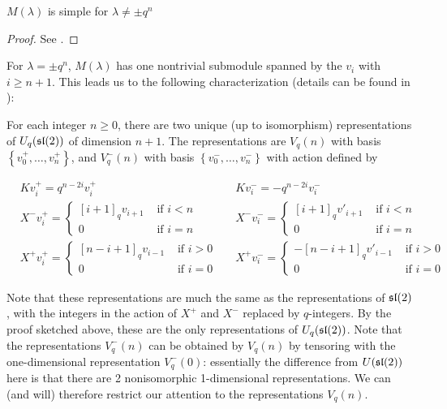 \begin{claim}
    $M(\lambda)$ is simple for $\lambda \neq \pm q^n$
\end{claim}

\begin{proof}
    See \cite{Jantzen1995}.
\end{proof}

For $\lambda = \pm q^{n}$, $M(\lambda)$ has one nontrivial submodule spanned by the $v_i$ with $i \geq n+1$.
This leads us to the following characterization (details can be found in \cite{Jantzen1995}):


For each integer $n \geq 0$, there are two unique (up to isomorphism)
representations of $U_q(\mathfrak{sl}(2))$ of dimension $n+1$. 
The representations are $V_q(n)$ with basis $\left\{ v^+_0, \ldots, v^+_n
\right\}$, and $V_q^-(n)$ with basis $\left\{ v^-_0, \ldots, v^-_n \right\}$
with action defined by 

\begin{align*}
    &K v^+_i = q^{n-2i} v^+_i  &
    &K v^-_i = -q^{n-2i} v^-_i \\
    &X^- v^+_i = \begin{cases} [i+1]_qv_{i+1}& \text{ if $i < n$} \\ 0& \text{ if $i = n$} \end{cases} &
    &X^- v^-_i = \begin{cases} [i+1]_qv'_{i+1}& \text{ if $i < n$} \\ 0& \text{ if $i = n$} \end{cases} \\
    & X^+  v^+_i = \begin{cases} 
                     [n-i+1]_qv_{i-1}& \text{ if $i > 0$} \\ 
                    0& \text{ if $i = 0$} 
             \end{cases} &
    & X^+  v^-_i = \begin{cases} 
                    -[n-i+1]_q v'_{i-1}& \text{ if $i > 0$} \\ 
                    0& \text{ if $i = 0$} 
             \end{cases}
\end{align*}

Note that these representations are much the same as the representations of
$\mathfrak{sl}(2)$, with the integers in the action of $X^+$ and $X^-$ replaced by
$q$-integers.
By the proof sketched above, these are the only representations of
$U_q(\mathfrak{sl}(2))$.  Note that the representations $V_q^-(n)$ can be obtained by
$V_q(n)$ by tensoring with the one-dimensional representation $V_q^-(0)$:
essentially the difference from $U(\mathfrak{sl}(2))$ here is that there are 2
nonisomorphic 1-dimensional representations. We can (and will) therefore
restrict our attention to the representations $V_q(n)$.

